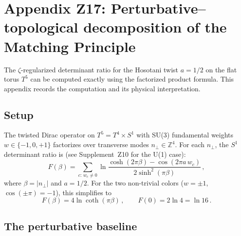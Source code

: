 \documentclass[11pt,a4paper]{article}
\begin{document}




\section{Appendix Z17: Perturbative--topological decomposition of the Matching Principle}
\label{app:decomposition}

The $\zeta$-regularized determinant ratio for the Hosotani twist
$a\!=\!1/2$ on the flat torus $T^5$ can be computed exactly using
the factorized product formula.  This appendix records the computation
and its physical interpretation.

\subsection{Setup}

The twisted Dirac operator on $T^5=T^4\times S^1$ with SU(3)
fundamental weights $w\in\{-1,0,+1\}$ factorizes over transverse
modes $n_\perp\in\mathbb{Z}^4$.  For each $n_\perp$, the $S^1$
determinant ratio is (see Supplement~Z10 for the U(1) case):
\begin{equation}
  F(\beta) = \sum_{c:\,w_c\neq 0}
    \ln\frac{\cosh(2\pi\beta)-\cos(2\pi a\,w_c)}{2\sinh^2(\pi\beta)}\,,
\end{equation}
where $\beta=|n_\perp|$ and $a=1/2$.  For the two non-trivial colors
($w=\pm 1$, $\cos(\pm\pi)=-1$), this simplifies to
\begin{equation}
  F(\beta) = 4\ln\coth(\pi\beta)\,,
  \qquad
  F(0) = 2\ln 4 = \ln 16\,.
\end{equation}

\subsection{The perturbative baseline}
\end{document}
